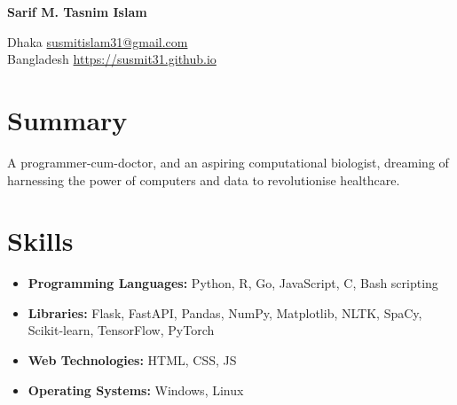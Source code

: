 \documentclass[12pt]{article}
\begin{document}
\begin{center}
     \Huge{\textbf{Sarif M. Tasnim Islam}}
\end{center}
Dhaka \hfill \href{mailto:susmitislam31@gmail.com}{susmitislam31@gmail.com}\\
Bangladesh \hfill \url{https://susmit31.github.io}

\section{Summary}
A programmer-cum-doctor, and an aspiring computational biologist, dreaming of harnessing the power of computers and data to revolutionise healthcare. 

\section{Skills}
\begin{itemize}
	\itemsep=-.3em
	\item \textbf{Programming Languages:} Python, R, Go, JavaScript, C, Bash scripting
	\item \textbf{Libraries:} Flask, FastAPI, Pandas, NumPy, Matplotlib, NLTK, SpaCy, Scikit-learn, TensorFlow, PyTorch
	\item \textbf{Web Technologies:} HTML, CSS, JS
	\item \textbf{Operating Systems:} Windows, Linux
\end{itemize}
\end{document}
